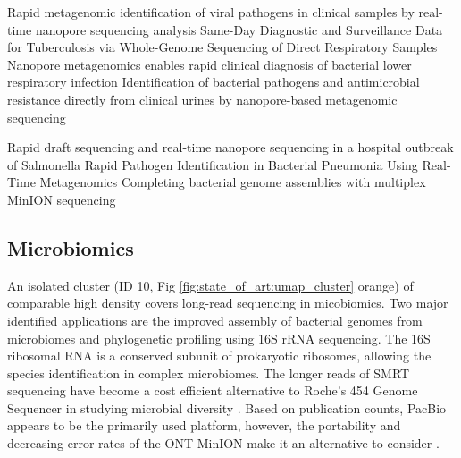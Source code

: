 Rapid metagenomic identification of viral pathogens in clinical samples by real-time nanopore sequencing analysis \cite{Greninger2015}
Same-Day Diagnostic and Surveillance Data for Tuberculosis via Whole-Genome Sequencing of Direct Respiratory Samples \cite{Votintseva2017}
Nanopore metagenomics enables rapid clinical diagnosis of bacterial lower respiratory infection \cite{Charalampous2019}
Identification of bacterial pathogens and antimicrobial resistance directly from clinical urines by nanopore-based metagenomic sequencing \cite{Schmidt2017}

Rapid draft sequencing and real-time nanopore sequencing in a hospital outbreak of Salmonella \cite{Quick2015}
Rapid Pathogen Identification in Bacterial Pneumonia Using Real-Time Metagenomics \cite{Pendleton2017}
Completing bacterial genome assemblies with multiplex MinION sequencing \cite{Wick2017}




\subsection{Microbiomics}
\label{subsec:state_of_art:metagenomics}

An isolated cluster (ID 10, Fig \ref{fig:state_of_art:umap_cluster} orange) of comparable high density covers long-read sequencing in micobiomics.
Two major identified applications are the improved assembly of bacterial genomes from microbiomes \cite{Koren2013, Moss2020} and phylogenetic profiling using 16S rRNA sequencing.
The 16S ribosomal RNA is a conserved subunit of prokaryotic ribosomes, allowing the species identification in complex microbiomes. 
The longer reads of SMRT sequencing have become a cost efficient alternative to Roche's 454 Genome Sequencer in studying microbial diversity \cite{Fichot2013, Mosher2014}.
Based on publication counts, PacBio appears to be the primarily used platform, however, the portability and decreasing error rates of the ONT MinION make it an alternative to consider \cite{Benitez-Paez2016}.


